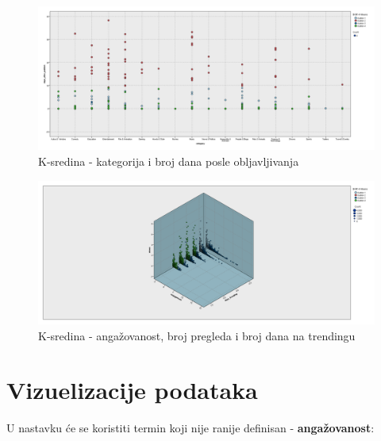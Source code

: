\documentclass[a4paper]{article}
\theoremstyle{definition}
\begin{document}
\begin{figure}[H]
\begin{center}
    \includegraphics[width=1\textwidth]{K-Means_category_days_after_publish.png}
    \caption{K-sredina -  kategorija i broj dana posle obljavljivanja}
     \label{fig:asoc2}
\end{center}
\end{figure}

\begin{figure}[H]
\begin{center}
    \includegraphics[width=1\textwidth]{K-Means_engagement_views_days_trending.png}
    \caption{K-sredina - angažovanost, broj pregleda i broj dana na trendingu }
     \label{fig:asoc2}
\end{center}
\end{figure}




\section{Vizuelizacije podataka}
\label{sec:dod}

U nastavku će se koristiti termin koji nije ranije definisan - \textbf{angažovanost}:
\newline
\end{document}
